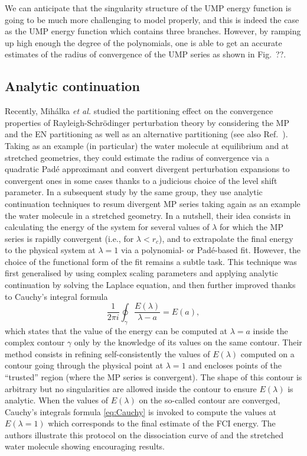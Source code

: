 \documentclass[aps,prb,reprint,noshowkeys,linenumbers,superscriptaddress]{revtex4-1}
\newcommand{\latin}[1]{#1}
\newcommand{\ie}{\latin{i.e.}}
\begin{document}
We can anticipate that the singularity structure of the UMP energy function is going to be much more challenging to model properly, and this is indeed the case as the UMP energy function which contains three branches.
However, by ramping up high enough the degree of the polynomials, one is able to get an accurate estimates of the radius of convergence of the UMP series as shown in Fig.~??.

\subsection{Analytic continuation}

Recently, Mih\'alka \textit{et al.} studied the partitioning effect on the convergence properties of Rayleigh-Schr\"odinger perturbation theory by considering the MP and the EN partitioning as well as an alternative partitioning \cite{Mihalka_2017a} (see also Ref.~).
Taking as an example (in particular) the water molecule at equilibrium and at stretched geometries, they could estimate the radius of convergence via a quadratic Pad\'e approximant and convert divergent perturbation expansions to convergent ones in some cases thanks to a judicious choice of the level shift parameter.
In a subsequent study by the same group, \cite{Mihalka_2017b} they use analytic continuation techniques to resum divergent MP series \cite{Goodson_2011} taking again as an example the water molecule in a stretched geometry.
In a nutshell, their idea consists in calculating the energy of the system for several values of $\lambda$ for which the MP series is rapidly convergent (\ie, for $\lambda < r_c$), and to extrapolate the final energy to the physical system at $\lambda = 1$ via a polynomial- or Pad\'e-based fit. 
However, the choice of the functional form of the fit remains a subtle task.
This technique was first generalised by using complex scaling parameters and applying analytic continuation by solving the Laplace equation, \cite{Surjan_2018} and then further improved thanks to Cauchy's integral formula \cite{Mihalka_2019}
\begin{equation}
	\label{eq:Cauchy}
	\frac{1}{2\pi i} \oint_{\gamma} \frac{E(\lambda)}{\lambda - a} = E(a),
\end{equation}
which states that the value of the energy can be computed at $\lambda=a$ inside the complex contour $\gamma$ only by the knowledge of its values on the same contour.
Their method consists in refining self-consistently the values of $E(\lambda)$ computed on a contour going through the physical point at $\lambda = 1$ and encloses points of the ``trusted'' region (where the MP series is convergent). The shape of this contour is arbitrary but no singularities are allowed inside the contour to ensure $E(\lambda)$ is analytic. 
When the values of $E(\lambda)$ on the so-called contour are converged, Cauchy's integrals formula \eqref{eq:Cauchy} is invoked to compute the values at $E(\lambda=1)$ which corresponds to the final estimate of the FCI energy.
The authors illustrate this protocol on the dissociation curve of  and the stretched water molecule showing encouraging results. \cite{Mihalka_2019} 
\end{document}

